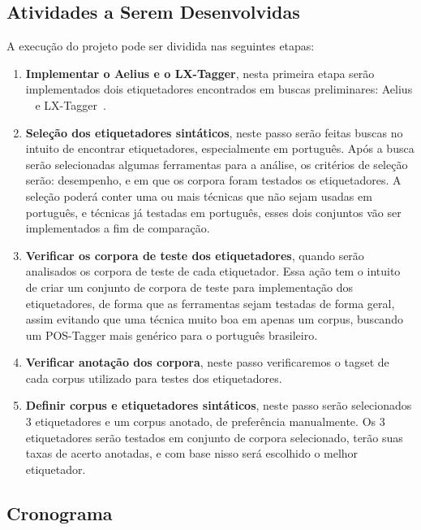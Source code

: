 


\subsection{Atividades a Serem Desenvolvidas}
\label{section:atividadesdesenvolvidas}

A execução do projeto pode ser dividida nas seguintes etapas:

\begin{enumerate}
    \item \textbf{Implementar o Aelius e o LX-Tagger}, nesta primeira etapa serão implementados dois etiquetadores encontrados em buscas preliminares: Aelius ~\cite{Aelius} e LX-Tagger~\cite{branco-silva-2004-evaluating}.
    
    \item \textbf{Seleção dos etiquetadores sintáticos}, neste passo serão feitas buscas no intuito de encontrar etiquetadores, especialmente em português. Após a busca serão selecionadas algumas ferramentas para a análise, os critérios de seleção serão: desempenho, e em que os corpora foram testados os etiquetadores. A seleção poderá conter uma ou mais técnicas que não sejam usadas em português, e técnicas já testadas em português, esses dois conjuntos vão ser implementados a fim de comparação. 
    
    \item\textbf{Verificar os corpora de teste dos etiquetadores}, quando serão analisados os corpora de teste de cada etiquetador. Essa ação tem o intuito de criar um conjunto de corpora de teste para implementação dos etiquetadores, de forma que as ferramentas sejam testadas de forma geral, assim evitando que uma técnica muito boa em apenas um corpus, buscando um POS-Tagger mais genérico para o português brasileiro.
    
    \item \textbf{Verificar anotação dos corpora}, neste passo verificaremos o tagset de cada corpus utilizado para testes dos etiquetadores.
    
    \item \textbf{Definir corpus e etiquetadores sintáticos}, neste passo serão selecionados 3 etiquetadores e um corpus anotado, de preferência manualmente. Os 3 etiquetadores serão testados em conjunto de corpora selecionado, terão suas taxas de acerto anotadas, e com base nisso será escolhido o melhor etiquetador.\cite{Cambria2014}
    \end{enumerate}

\subsection{Cronograma}

